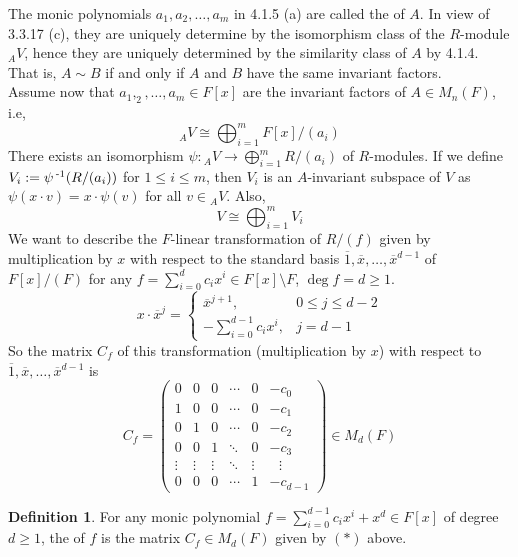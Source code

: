 \documentclass[11pt]{book}
\theoremstyle{definition}   \newtheorem{defn}[counter]{Definition} %
\newcommand{\ov}{\overline}   \newcommand{\wt}{\widetilde}
\newcommand{\bs}{\setminus}   \newcommand{\A}{\mathcal{A}}   \newcommand{\sy}{\textnormal{Syl}}   \newcommand{\size}[1]{\left| #1 \right|}
\newcommand{\mymatrix}[2]{\left( \begin{array}{#1} #2 \end{array} \right)}
\DeclareMathOperator{\ra}{\rightarrow}   \DeclareMathOperator{\Poly}{\mathbf{P}}   \DeclareMathOperator{\spn}{\textnormal{span}}   \DeclareMathOperator{\aut}{\textnormal{Aut}}
\newcommand{\vs}{\vspace{8pt}}
\numberwithin{counter}{chapter}
\begin{document}
\vs

\begin{remark}[+ Definition]
The monic polynomials $a_1,a_2,\dots,a_m$ in 4.1.5 (a) are called the  of $A$. In view of 3.3.17 (c), they are uniquely determine by the isomorphism class of the $R$-module $_AV$, hence they are uniquely determined by the similarity class of $A$ by 4.1.4. That is, $A \sim B$ if and only if $A$ and $B$ have the same invariant factors. \\

Assume now that $a_1,_2,\dots,a_m \in F[x]$ are the invariant factors of $A \in M_n(F)$, i.e,
	\[_AV \cong \bigoplus_{i=1}^m F[x]/(a_i) \]
There exists an isomorphism $\psi : {_AV} \ra \bigoplus_{i=1}^m R/(a_i)$ of $R$-modules. If we define $V_i := \psi\operatorname{^{-1}}(R/(a_i))$ for $1 \leq i \leq m$, then $V_i$ is an $A$-invariant subspace of $V$ as $\psi(x \cdot v) = x \cdot \psi(v)$ for all $v \in {_AV}$. Also,
	\[V \cong \bigoplus_{i=1}^m V_i \]
We want to describe the $F$-linear transformation of $R/(f)$ given by multiplication by $x$ with respect to the standard basis $\ov{1},\ov{x},\dots,\ov{x}^{d-1}$ of $F[x]/(F)$ for any $f = \sum_{i=0}^d c_i x^i \in F[x]\bs F$, $\deg f = d \geq 1$.
	\[x \cdot \ov{x}^j = \begin{cases}
	\ov{x}^{j+1}, \quad & 0 \leq j \leq d-2 \\
	-\sum_{i=0}^{d-1} c_i x^i, & j = d-1
	\end{cases} \]
So the matrix $C_f$ of this transformation (multiplication by $x$) with respect to $\ov{1},\ov{x},\dots,\ov{x}^{d-1}$ is
	\[C_f = \mymatrix{cccccl}{0 & 0 & 0 & \cdots & 0 & -c_0 \\
							  1 & 0 & 0 & \cdots & 0 & -c_1 \\
							  0 & 1 & 0 & \cdots & 0 & -c_2 \\
							  0 & 0 & 1 & \ddots & 0 & -c_3 \\
							  \vdots & \vdots & \vdots & \ddots & \vdots & \ \ \ \vdots \\
							  0 & 0 & 0 & \cdots & 1 & -c_{d-1}} \in M_d(F) \tag{$\ast$}\]
\end{remark}

\vs

\begin{defn}
For any monic polynomial $f = \sum_{i=0}^{d-1} c_i x^i + x^d \in F[x]$ of degree $d \geq 1$, the  of $f$ is the matrix $C_f \in M_d(F)$ given by $(\ast)$ above.
\end{defn}
\end{document}
